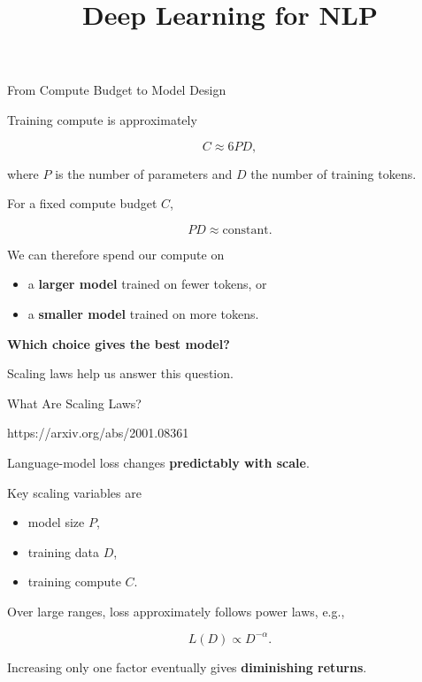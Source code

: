 \documentclass[11pt,compress,t,notes=noshow, xcolor=table]{beamer}
\title{Deep Learning for NLP}
\begin{document}




\begin{vbframe}{From Compute Budget to Model Design}

Training compute is approximately

\[
C \approx 6PD,
\]

where $P$ is the number of parameters and $D$ the number of training tokens.

For a fixed compute budget $C$,

\[
PD \approx \text{constant}.
\]

We can therefore spend our compute on

\begin{itemize}
    \item a \textbf{larger model} trained on fewer tokens, or
    \item a \textbf{smaller model} trained on more tokens.
\end{itemize}

\begin{center}
\textbf{Which choice gives the best model?}
\end{center}

Scaling laws help us answer this question.

\end{vbframe}

\begin{vbframe}{What Are Scaling Laws?}

{https://arxiv.org/abs/2001.08361}

Language-model loss changes \textbf{predictably with scale}.

Key scaling variables are

\begin{itemize}
    \item model size $P$,
    \item training data $D$,
    \item training compute $C$.
\end{itemize}

Over large ranges, loss approximately follows power laws, e.g.,

\[
L(D) \propto D^{-\alpha}.
\]

Increasing only one factor eventually gives
\textbf{diminishing returns}.

\end{vbframe}
\end{document}
